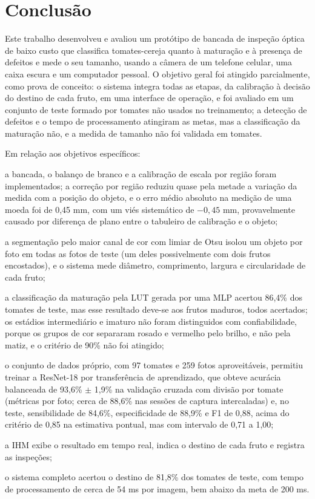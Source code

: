 \chapter{Conclusão}\label{cap:conclusao}

Este trabalho desenvolveu e avaliou um protótipo de bancada de inspeção óptica de baixo custo que classifica tomates-cereja quanto à maturação e à presença de defeitos e mede o seu tamanho, usando a câmera de um telefone celular, uma caixa escura e um computador pessoal. O objetivo geral foi atingido parcialmente, como prova de conceito: o sistema integra todas as etapas, da calibração à decisão do destino de cada fruto, em uma interface de operação, e foi avaliado em um conjunto de teste formado por tomates não usados no treinamento; a detecção de defeitos e o tempo de processamento atingiram as metas, mas a classificação da maturação não, e a medida de tamanho não foi validada em tomates.

Em relação aos objetivos específicos:
\begin{alineas}
	\item a bancada, o balanço de branco e a calibração de escala por região foram implementados; a correção por região reduziu quase pela metade a variação da medida com a posição do objeto, e o erro médio absoluto na medição de uma moeda foi de 0,45 mm, com um viés sistemático de $-0{,}45$ mm, provavelmente causado por diferença de plano entre o tabuleiro de calibração e o objeto;
	\item a segmentação pelo maior canal de cor com limiar de Otsu isolou um objeto por foto em todas as fotos de teste (um deles possivelmente com dois frutos encostados), e o sistema mede diâmetro, comprimento, largura e circularidade de cada fruto;
	\item a classificação da maturação pela LUT gerada por uma MLP acertou 86,4\% dos tomates de teste, mas esse resultado deve-se aos frutos maduros, todos acertados; os estádios intermediário e imaturo não foram distinguidos com confiabilidade, porque os grupos de cor separaram rosado e vermelho pelo brilho, e não pela matiz, e o critério de 90\% não foi atingido;
	\item o conjunto de dados próprio, com 97 tomates e 259 fotos aproveitáveis, permitiu treinar a ResNet-18 por transferência de aprendizado, que obteve acurácia balanceada de 93,6\% $\pm$ 1,9\% na validação cruzada com divisão por tomate (métricas por foto; cerca de 88,6\% nas sessões de captura intercaladas) e, no teste, sensibilidade de 84,6\%, especificidade de 88,9\% e F1 de 0,88, acima do critério de 0,85 na estimativa pontual, mas com intervalo de 0,71 a 1,00;
	\item a IHM exibe o resultado em tempo real, indica o destino de cada fruto e registra as inspeções;
	\item o sistema completo acertou o destino de 81,8\% dos tomates de teste, com tempo de processamento de cerca de 54 ms por imagem, bem abaixo da meta de 200 ms.
\end{alineas}

